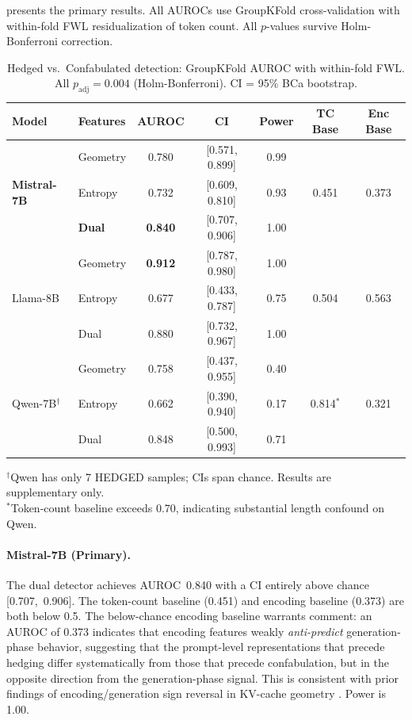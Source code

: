 \documentclass[11pt,a4paper]{article}
\begin{document}
 presents the primary results. All AUROCs use GroupKFold cross-validation with within-fold FWL residualization of token count. All $p$-values survive Holm-Bonferroni correction.

\begin{table}[H]
\centering
\caption{Hedged vs.\ Confabulated detection: GroupKFold AUROC with within-fold FWL. All $p_\text{adj} = 0.004$ (Holm-Bonferroni). CI = 95\% BCa bootstrap.}
\label{tab:main}
\begin{tabular}{llccccc}
\toprule
\textbf{Model} & \textbf{Features} & \textbf{AUROC} & \textbf{CI} & \textbf{Power} & \textbf{TC Base} & \textbf{Enc Base} \\
\midrule
\multirow{3}{*}{\textbf{Mistral-7B}}
  & Geometry & 0.780 & [0.571, 0.899] & 0.99 & \multirow{3}{*}{0.451} & \multirow{3}{*}{0.373} \\
  & Entropy  & 0.732 & [0.609, 0.810] & 0.93 & & \\
  & \textbf{Dual} & \textbf{0.840} & [0.707, 0.906] & 1.00 & & \\
\midrule
\multirow{3}{*}{Llama-8B}
  & Geometry & \textbf{0.912} & [0.787, 0.980] & 1.00 & \multirow{3}{*}{0.504} & \multirow{3}{*}{0.563} \\
  & Entropy  & 0.677 & [0.433, 0.787] & 0.75 & & \\
  & Dual     & 0.880 & [0.732, 0.967] & 1.00 & & \\
\midrule
\multirow{3}{*}{Qwen-7B$^\dagger$}
  & Geometry & 0.758 & [0.437, 0.955] & 0.40 & \multirow{3}{*}{0.814$^*$} & \multirow{3}{*}{0.321} \\
  & Entropy  & 0.662 & [0.390, 0.940] & 0.17 & & \\
  & Dual     & 0.848 & [0.500, 0.993] & 0.71 & & \\
\bottomrule
\end{tabular}

\smallskip
\footnotesize{$^\dagger$Qwen has only 7 HEDGED samples; CIs span chance. Results are supplementary only.}\\
\footnotesize{$^*$Token-count baseline exceeds 0.70, indicating substantial length confound on Qwen.}
\end{table}

\paragraph{Mistral-7B (Primary).} The dual detector achieves AUROC~0.840 with a CI entirely above chance [0.707,~0.906]. The token-count baseline (0.451) and encoding baseline (0.373) are both below 0.5. The below-chance encoding baseline warrants comment: an AUROC of 0.373 indicates that encoding features weakly \emph{anti-predict} generation-phase behavior, suggesting that the prompt-level representations that precede hedging differ systematically from those that precede confabulation, but in the opposite direction from the generation-phase signal. This is consistent with prior findings of encoding/generation sign reversal in KV-cache geometry \citep{edrington2026detecting}. Power is 1.00.
\end{document}
